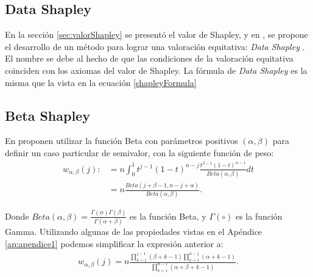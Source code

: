 \subsection*{Data Shapley}
En la sección \ref{sec:valorShapley} se presentó
el valor de Shapley, y en \cite{shapleyValue}, se propone
el desarrollo de un método para lograr una valoración equitativa:
\textit{Data Shapley} . El nombre se debe al
hecho de que las condiciones de la valoración equitativa coinciden
con los axiomas del valor de Shapley. La fórmula de \textit{Data Shapley} es
la misma que la vista en la ecuación \ref{shapleyFormula}





\subsection*{Beta Shapley}
En \cite{betaShapley} proponen  utilizar la función Beta con
parámetros positivos $(\alpha,\beta)$ para definir
un caso particular de semivalor, con la siguiente función de peso:
\begin{equation*}
  \begin{split}
    w_{\alpha, \beta}(j) :&= n \int_{0}^{1} t^{j-1}(1-t)^{n-j}
    \frac{t^{\beta-1}(1-t)^{\alpha-1}}{Beta(\alpha,\beta)}dt\\
    &= n\frac{Beta(j+\beta-1, n-j+\alpha)}
  {Beta(\alpha,\beta)}.
  \end{split}
\end{equation*}
 
Donde $Beta(\alpha,\beta) = \frac{\Gamma(\alpha)\Gamma(\beta)}
{\Gamma(\alpha+\beta)}$ es la función Beta, y $\Gamma(\circ)$ es
la función Gamma. Utilizando algunas de las propiedades vistas
en el Apéndice \ref{ap:apendice1} podemos simplificar la expresión
anterior a: 
\begin{equation*}
  \begin{split}
  \label{eq:pesoBeta}
  w_{\alpha, \beta}(j) = n\frac{\prod_{k=1}^{j-1}(\beta+k-1)
  \prod_{k=1}^{n-j}(\alpha+k-1)}
  {\prod_{k=1}^{n-1}(\alpha+\beta+k-1)}.
  \end{split}
\end{equation*}

